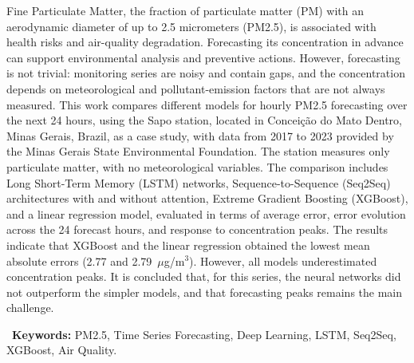 Fine Particulate Matter, the fraction of particulate matter (PM) with an aerodynamic diameter of up to 2.5 micrometers (PM2.5), is associated with health risks and air-quality degradation. Forecasting its concentration in advance can support environmental analysis and preventive actions. However, forecasting is not trivial: monitoring series are noisy and contain gaps, and the concentration depends on meteorological and pollutant-emission factors that are not always measured. This work compares different models for hourly PM2.5 forecasting over the next 24 hours, using the Sapo station, located in Conceição do Mato Dentro, Minas Gerais, Brazil, as a case study, with data from 2017 to 2023 provided by the Minas Gerais State Environmental Foundation. The station measures only particulate matter, with no meteorological variables. The comparison includes Long Short-Term Memory (LSTM) networks, Sequence-to-Sequence (Seq2Seq) architectures with and without attention, Extreme Gradient Boosting (XGBoost), and a linear regression model, evaluated in terms of average error, error evolution across the 24 forecast hours, and response to concentration peaks. The results indicate that XGBoost and the linear regression obtained the lowest mean absolute errors (2.77 and 2.79~\(\mu\)g/m\(^3\)). However, all models underestimated concentration peaks. It is concluded that, for this series, the neural networks did not outperform the simpler models, and that forecasting peaks remains the main challenge.

\noindent \ \textbf{Keywords:} PM2.5, Time Series Forecasting, Deep Learning, LSTM, Seq2Seq, XGBoost, Air Quality.
